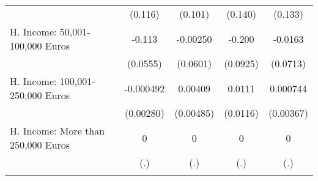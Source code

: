 {\begin{tabular}{l*{4}{c}}
            &     (0.116)         &     (0.101)         &     (0.140)         &     (0.133)         \\
[1em]
H. Income: 50,001-100,000 Euros&      -0.113\sym{*}  &    -0.00250         &      -0.200\sym{*}  &     -0.0163         \\
            &    (0.0555)         &    (0.0601)         &    (0.0925)         &    (0.0713)         \\
[1em]
H. Income: 100,001-250,000 Euros&   -0.000492         &     0.00409         &      0.0111         &    0.000744         \\
            &   (0.00280)         &   (0.00485)         &    (0.0116)         &   (0.00367)         \\
[1em]
H. Income: More than 250,000 Euros&           0         &           0         &           0         &           0         \\
            &         (.)         &         (.)         &         (.)         &         (.)         \\
\hline\hline
{}\\
\end{tabular}
}
